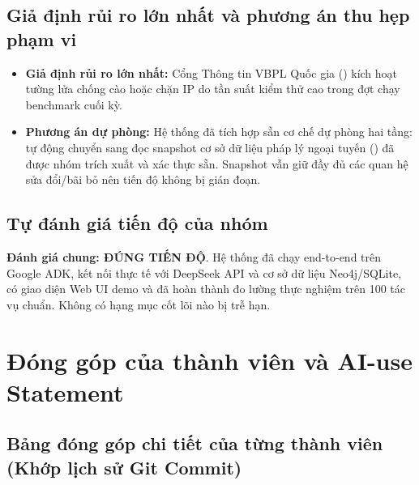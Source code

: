 \documentclass[10pt,a4paper]{article}
\begin{document}
\subsection{Giả định rủi ro lớn nhất và phương án thu hẹp phạm vi}
\begin{itemize}
  \item \textbf{Giả định rủi ro lớn nhất:} Cổng Thông tin VBPL Quốc gia () kích hoạt tường lửa chống cào hoặc chặn IP do tần suất kiểm thử cao trong đợt chạy benchmark cuối kỳ.
  \item \textbf{Phương án dự phòng:} Hệ thống đã tích hợp sẵn cơ chế dự phòng hai tầng: tự động chuyển sang đọc snapshot cơ sở dữ liệu pháp lý ngoại tuyến () đã được nhóm trích xuất và xác thực sẵn. Snapshot vẫn giữ đầy đủ các quan hệ sửa đổi/bãi bỏ nên tiến độ không bị gián đoạn.
\end{itemize}

\subsection{Tự đánh giá tiến độ của nhóm}
\textbf{Đánh giá chung: ĐÚNG TIẾN ĐỘ}. Hệ thống đã chạy end-to-end trên Google ADK, kết nối thực tế với DeepSeek API và cơ sở dữ liệu Neo4j/SQLite, có giao diện Web UI demo và đã hoàn thành đo lường thực nghiệm trên 100 tác vụ chuẩn. Không có hạng mục cốt lõi nào bị trễ hạn.

\section{Đóng góp của thành viên và AI-use Statement}

\subsection{Bảng đóng góp chi tiết của từng thành viên (Khớp lịch sử Git Commit)}
\end{document}
